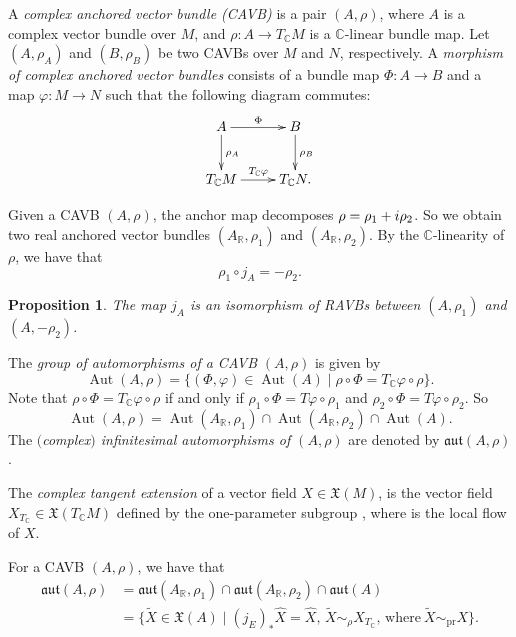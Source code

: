 \documentclass[11pt]{article}
\numberwithin{equation}{section}
\numberwithin{equation}{section}
\newtheorem{Proposition}[Theorem]{Proposition}
 { \theoremstyle{definition}
\newtheorem{Definition}[Theorem]{Definition}
\newtheorem{Note}[Theorem]{Note}
\newtheorem{Example}[Theorem]{Example}
\newtheorem{Examples}[Theorem]{Examples}
\newtheorem{Remark}[Theorem]{Remark} }
\newcommand{\R}{{\mathbb{R}}}
\newcommand{\C}{{\mathbb{C}}}
\newcommand{\X}{\mathfrak{X}}
\newcommand{\aut}{\mathfrak{aut}}
\DeclareMathOperator{\Aut}{Aut}
\DeclareMathOperator{\pr}{pr}
\begin{document}
\begin{Definition}
 A {\em complex anchored vector bundle (CAVB)} is a pair $(A,\rho)$, where $A$ is a complex vector bundle over $M$, and $\rho\colon A\to T_{\C}M$ is a $\C$-linear bundle map. Let $(A,\rho_A)$ and $(B,\rho_B)$ be two CAVBs over $M$ and $N$, respectively. A {\em morphism of complex anchored vector bundles} consists of a bundle map $\Phi\colon A\to B$ and a map $\varphi\colon M\to N$ such that the following diagram commutes:
\[\xymatrix{A\ar[d]^{\rho_A}\ar[r]^{\Phi} & B\ar[d]^{\rho_B}\\ T_{\C}M\ar[r]^{T_{\C}\varphi} & T_{\C}N.
}\]

\end{Definition}
Given a CAVB $(A, \rho)$, the anchor map decomposes $\rho=\rho_1+{\rm i}\rho_2$. So we obtain two real anchored vector bundles $(A_{\R},\rho_1)$ and $(A_{\R}, \rho_2)$. By the $\C$-linearity of $\rho$, we have that
\[\rho_1 \circ j_A=-\rho_2.\]
\begin{Proposition}
The map $j_A$ is an isomorphism of RAVBs between $(A, \rho_1)$ and $(A,-\rho_2)$.
\end{Proposition}
 The {\em group of automorphisms of a CAVB} $(A,\rho)$ is given by
 \[\Aut(A,\rho)=\{(\Phi, \varphi)\in \Aut(A)\mid \rho\circ\Phi=T_{\C}\varphi\circ \rho\}.\]
 Note that $\rho\circ\Phi=T_{\C}\varphi\circ \rho$ if and only if $\rho_1\circ \Phi=T\varphi\circ \rho_1$ and $\rho_2\circ \Phi=T\varphi\circ \rho_2$. So
 \[\Aut(A,\rho)=\Aut(A_{\R},\rho_1)\cap \Aut(A_{\R},\rho_2)\cap \Aut (A).\]
 The {\em $($complex$)$ infinitesimal automorphisms of $(A,\rho)$} are denoted by $\aut(A,\rho)$.
\begin{Definition}\label{cx_tangent_extension}
   The {\em complex tangent extension} of a vector field $X\in \X(M)$, is the vector field $X_{T_{\C}}\in \mathfrak{X}(T_{\C}M)$ defined by the one-parameter subgroup \smash{$T_{\C}\varphi_t ^{X}$}, where  is the local flow of $X$.
\end{Definition}

For a CAVB $(A,\rho)$, we have that
\begin{align*}
\mathfrak{aut}(A,\rho)&{}=\aut(A_{\R},\rho_1)\cap \aut(A_{\R},\rho_2)\cap \aut(A)\\
&{}=\bigl\{\widetilde{X}\in \X(A)\mid (j_E)_* \hat{X}=\hat{X},\, \widetilde{X}\sim_{\rho} X_{T_{\C}},\, \text{where}\ \widetilde{X}\sim_{\pr} X\bigr\}.
\end{align*}
\end{document}
